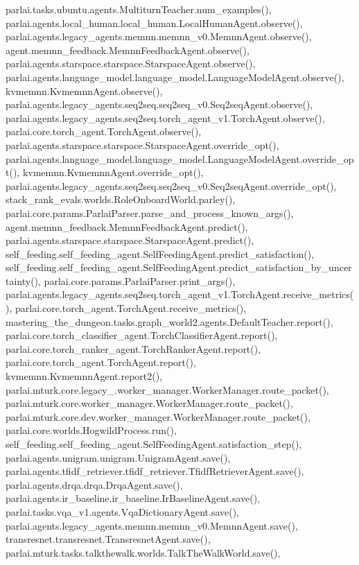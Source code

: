 parlai.\+tasks.\+ubuntu.\+agents.\+Multiturn\+Teacher.\+num\+\_\+examples(), parlai.\+agents.\+local\+\_\+human.\+local\+\_\+human.\+Local\+Human\+Agent.\+observe(), parlai.\+agents.\+legacy\+\_\+agents.\+memnn.\+memnn\+\_\+v0.\+Memnn\+Agent.\+observe(), agent.\+memnn\+\_\+feedback.\+Memnn\+Feedback\+Agent.\+observe(), parlai.\+agents.\+starspace.\+starspace.\+Starspace\+Agent.\+observe(), parlai.\+agents.\+language\+\_\+model.\+language\+\_\+model.\+Language\+Model\+Agent.\+observe(), kvmemnn.\+Kvmemnn\+Agent.\+observe(), parlai.\+agents.\+legacy\+\_\+agents.\+seq2seq.\+seq2seq\+\_\+v0.\+Seq2seq\+Agent.\+observe(), parlai.\+agents.\+legacy\+\_\+agents.\+seq2seq.\+torch\+\_\+agent\+\_\+v1.\+Torch\+Agent.\+observe(), parlai.\+core.\+torch\+\_\+agent.\+Torch\+Agent.\+observe(), parlai.\+agents.\+starspace.\+starspace.\+Starspace\+Agent.\+override\+\_\+opt(), parlai.\+agents.\+language\+\_\+model.\+language\+\_\+model.\+Language\+Model\+Agent.\+override\+\_\+opt(), kvmemnn.\+Kvmemnn\+Agent.\+override\+\_\+opt(), parlai.\+agents.\+legacy\+\_\+agents.\+seq2seq.\+seq2seq\+\_\+v0.\+Seq2seq\+Agent.\+override\+\_\+opt(), stack\+\_\+rank\+\_\+evals.\+worlds.\+Role\+Onboard\+World.\+parley(), parlai.\+core.\+params.\+Parlai\+Parser.\+parse\+\_\+and\+\_\+process\+\_\+known\+\_\+args(), agent.\+memnn\+\_\+feedback.\+Memnn\+Feedback\+Agent.\+predict(), parlai.\+agents.\+starspace.\+starspace.\+Starspace\+Agent.\+predict(), self\+\_\+feeding.\+self\+\_\+feeding\+\_\+agent.\+Self\+Feeding\+Agent.\+predict\+\_\+satisfaction(), self\+\_\+feeding.\+self\+\_\+feeding\+\_\+agent.\+Self\+Feeding\+Agent.\+predict\+\_\+satisfaction\+\_\+by\+\_\+uncertainty(), parlai.\+core.\+params.\+Parlai\+Parser.\+print\+\_\+args(), parlai.\+agents.\+legacy\+\_\+agents.\+seq2seq.\+torch\+\_\+agent\+\_\+v1.\+Torch\+Agent.\+receive\+\_\+metrics(), parlai.\+core.\+torch\+\_\+agent.\+Torch\+Agent.\+receive\+\_\+metrics(), mastering\+\_\+the\+\_\+dungeon.\+tasks.\+graph\+\_\+world2.\+agents.\+Default\+Teacher.\+report(), parlai.\+core.\+torch\+\_\+classifier\+\_\+agent.\+Torch\+Classifier\+Agent.\+report(), parlai.\+core.\+torch\+\_\+ranker\+\_\+agent.\+Torch\+Ranker\+Agent.\+report(), parlai.\+core.\+torch\+\_\+agent.\+Torch\+Agent.\+report(), kvmemnn.\+Kvmemnn\+Agent.\+report2(), parlai.\+mturk.\+core.\+legacy\+\_.\+worker\+\_\+manager.\+Worker\+Manager.\+route\+\_\+packet(), parlai.\+mturk.\+core.\+worker\+\_\+manager.\+Worker\+Manager.\+route\+\_\+packet(), parlai.\+mturk.\+core.\+dev.\+worker\+\_\+manager.\+Worker\+Manager.\+route\+\_\+packet(), parlai.\+core.\+worlds.\+Hogwild\+Process.\+run(), self\+\_\+feeding.\+self\+\_\+feeding\+\_\+agent.\+Self\+Feeding\+Agent.\+satisfaction\+\_\+step(), parlai.\+agents.\+unigram.\+unigram.\+Unigram\+Agent.\+save(), parlai.\+agents.\+tfidf\+\_\+retriever.\+tfidf\+\_\+retriever.\+Tfidf\+Retriever\+Agent.\+save(), parlai.\+agents.\+drqa.\+drqa.\+Drqa\+Agent.\+save(), parlai.\+agents.\+ir\+\_\+baseline.\+ir\+\_\+baseline.\+Ir\+Baseline\+Agent.\+save(), parlai.\+tasks.\+vqa\+\_\+v1.\+agents.\+Vqa\+Dictionary\+Agent.\+save(), parlai.\+agents.\+legacy\+\_\+agents.\+memnn.\+memnn\+\_\+v0.\+Memnn\+Agent.\+save(), transresnet.\+transresnet.\+Transresnet\+Agent.\+save(), parlai.\+mturk.\+tasks.\+talkthewalk.\+worlds.\+Talk\+The\+Walk\+World.\+save(), 